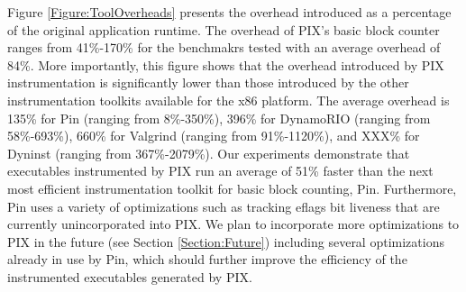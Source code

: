 Figure \ref{Figure:ToolOverheads} presents the overhead introduced as a percentage of the original application runtime. The
overhead of PIX's basic block counter ranges from 41\%-170\% for the benchmakrs tested with an average overhead of 
84\%. More importantly, this figure shows that the overhead introduced by PIX instrumentation is significantly 
lower than those introduced by the other instrumentation toolkits available for the x86 platform. 
The average overhead is 135\% for Pin (ranging from 8\%-350\%), 
396\% for DynamoRIO (ranging from 58\%-693\%), 660\% for Valgrind (ranging from 91\%-1120\%), and XXX\% for Dyninst (ranging from 367\%-2079\%). 
Our experiments demonstrate that executables instrumented by PIX run an average of
51\% faster than the next most efficient instrumentation toolkit for basic block counting, Pin. Furthermore,
Pin uses a variety of optimizations such as tracking eflags bit liveness \cite{luk2005pin} that are currently
unincorporated into PIX. We plan to incorporate more optimizations to PIX in the future (see Section \ref{Section:Future}) including
several optimizations already in use by Pin, which should further improve the efficiency of the instrumented
executables generated by PIX.

